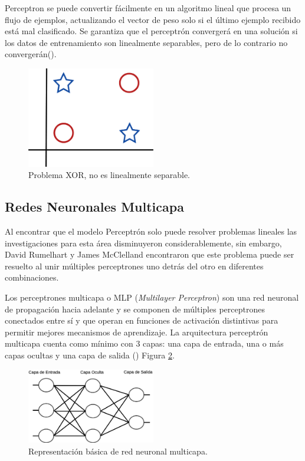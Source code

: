 Perceptron se puede convertir fácilmente en un algoritmo lineal que procesa un flujo de ejemplos, actualizando el vector de peso solo si el último ejemplo recibido está mal clasificado. Se garantiza que el perceptrón convergerá en una solución si los datos de entrenamiento son linealmente separables, pero de lo contrario no convergerán(\cite{flach2012Machine}).

\begin{figure}[H]
    \centering
    \includegraphics[width=0.5\textwidth]{MarcoTeorico/imgs/XOR.png}
    \caption{Problema XOR, no es linealmente separable.}
    \label{fig:xor}
\end{figure}


\subsection{Redes Neuronales Multicapa}


Al encontrar que el modelo Perceptrón solo puede resolver problemas lineales las investigaciones para esta área disminuyeron considerablemente, sin embargo, David Rumelhart y James McClelland encontraron que este problema puede ser resuelto al unir múltiples perceptrones uno detrás del otro en diferentes combinaciones.

Los perceptrones multicapa o MLP (\textit{Multilayer Perceptron}) son una red neuronal de propagación hacia adelante y se componen de múltiples perceptrones conectados entre sí y que operan en funciones de activación distintivas para permitir mejores mecanismos de aprendizaje. La arquitectura perceptrón multicapa cuenta como mínimo con 3 capas: una capa de entrada, una o más capas ocultas y una capa de salida (\cite{swamynathan2017Mastering}) Figura \ref{fig:mlp}.

\begin{figure}[H]
    \centering
    \includegraphics[width=0.5\textwidth]{MarcoTeorico/imgs/MLP.png}
    \caption{Representación básica de red neuronal multicapa.}
    \label{fig:mlp}
\end{figure}

